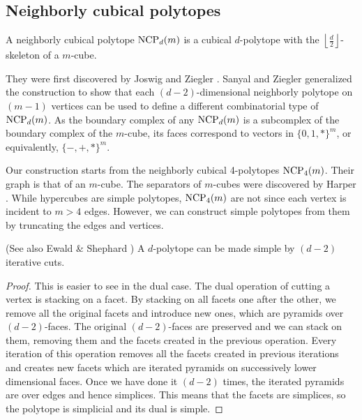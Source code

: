 \subsection{Neighborly cubical polytopes}

\begin{definition}
A neighborly cubical polytope $\textrm{NCP}_d(m)$ is a cubical $d$-polytope with the $\left\lfloor \frac{d}{2} 
\right\rfloor$-skeleton of a $m$-cube.
\end{definition}

They were first discovered by Joswig and Ziegler \cite{Z62}. Sanyal and Ziegler \cite{Z102}
generalized the construction to show that each $(d-2)$-dimensional neighborly 
polytope on $(m-1)$ vertices can be used to define a 
different combinatorial type of $\textrm{NCP}_d(m)$. As the boundary complex of any $\textrm{NCP}_d(m)$
is a subcomplex of the boundary complex of the $m$-cube, its faces correspond to vectors
in $\{0,1,*\}^m$, or equivalently, $\{-,+,*\}^m$.


Our construction starts from the neighborly cubical 4-polytopes $\textrm{NCP}_4(m)$. 
Their graph is that of an $m$-cube. The separators of $m$-cubes were discovered by Harper 
\cite{Harp}.
While hypercubes are simple polytopes, $\textrm{NCP}_4(m)$ are not since each vertex is 
incident to $m>4$ edges. However, we can construct simple polytopes from them by 
truncating the edges and vertices.

 

\begin{lemma}
(See also Ewald \& Shephard \cite{EwSh}) A $d$-polytope can be made simple 
by $(d-2)$ iterative cuts.
\end{lemma}

\begin{proof}
This is easier to see in the dual case. The dual operation of cutting a vertex 
is stacking on a facet. By stacking on all facets one after the other, we 
remove all the original facets and introduce new ones, which are pyramids over 
$(d-2)$-faces. The original $(d-2)$-faces are preserved and we can stack on 
them, removing them and the facets created in the previous operation. Every 
iteration of this operation removes all the facets created in previous 
iterations and creates new facets which are iterated pyramids on successively 
lower dimensional faces. Once we have done it $(d-2)$ times, the iterated 
pyramids are over edges and hence simplices. This means that the facets are 
simplices, so the polytope is simplicial and its dual is simple.
\end{proof}

